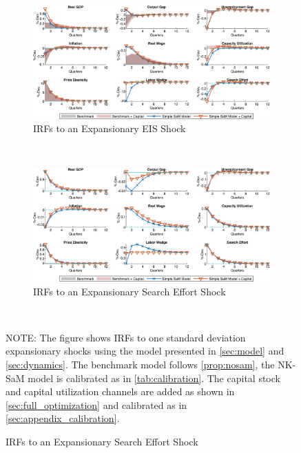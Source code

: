 \documentclass[12pt,3p,authoryear,review]{elsarticle}
\begin{document}
\begin{figure}%
    \centering%
    \caption{Adding Capital (Utilization) - IRFs to Expansionary Cost Push Shocks}\label{fig:app_irf_robust_capital_2}%
    \begin{subfigure}{\textwidth}%
        \centering%
        \caption{IRFs to an Expansionary EIS Shock}%
        \includegraphics[width=\textwidth]{fig_35_irf_robust_capital_eis.png}%
    \end{subfigure}\\%
	\vspace{0.2in}%
    \begin{subfigure}{\textwidth}%
        \centering%
        \caption{IRFs to an Expansionary Search Effort Shock}%
        \includegraphics[width=\textwidth]{fig_36_irf_robust_capital_search.png}%
    \end{subfigure}\\%
    {\tiny \singlespacing NOTE: The figure shows IRFs to one standard deviation expansionary shocks using the model presented in \cref{sec:model} and \cref{sec:dynamics}. The benchmark model follows \cref{prop:nosam}, the NK-SaM model is calibrated as in \cref{tab:calibration}. The capital stock and capital utilization channels are added as shown in \ref{sec:full_optimization} and calibrated as in \ref{sec:appendix_calibration}.\par}%
\end{figure}%
\FloatBarrier%
\end{document}
